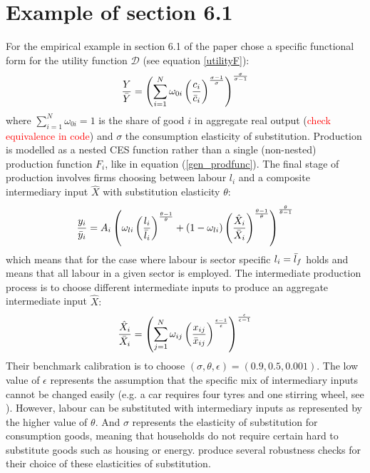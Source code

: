 \documentclass{article}
\begin{document}
\section{Example of section 6.1}
For the empirical example in section 6.1 of the paper \parencite{BF2019} chose a specific functional form for the utility function $\mathcal{D}$ (see equation \ref{utilityF}):
    \begin{equation}
        \frac{Y}{\Bar{Y}} = \left(  \sum_{i=1}^N \omega_{0i} \left( \frac{c_i}{\Bar{c}_i}\right)^{\frac{\sigma-1}{\sigma}} \right)^{\frac{\sigma}{\sigma-1}}
    \end{equation}
where $\sum_{i=1}^N \omega_{0i}=1$ is the share of good $i$ in aggregate real output (\textcolor{red}{check equivalence in code}) and $\sigma$ the consumption elasticity of substitution. \newline
Production is modelled as a nested CES function rather than a single (non-nested) production function $F_i$, like in equation (\ref{gen_prodfunc}). The final stage of production involves firms choosing between labour $l_i$ and a composite intermediary input $\hat{X}$ with substitution elasticity $\theta$:
    \begin{equation}
        \label{eq:cesprodfun}
        \frac{y_i}{\Bar{y}_i} = A_i \left(   \omega_{li} \left( \frac{l_i}{\Bar{l}_i}\right)^{\frac{\theta-1}{\theta}} + (1-\omega_{li}) \left( \frac{\hat{X}_i}{\Bar{X}_i}\right)^{\frac{\theta-1}{\theta}} \right)^{\frac{\theta}{\theta-1}}
    \end{equation}
which means that for the case where labour is sector specific $l_i = \Bar{l}_f$ holds and means that all labour in a given sector is employed. The intermediate production process is to choose different intermediate inputs to produce an aggregate intermediate input $\hat{X}:$
    \begin{equation}
        \frac{\hat{X}_i}{\Bar{X}_i} = \left(  \sum_{j=1}^N \omega_{ij} \left( \frac{x_{ij}}{\Bar{x}_{ij}}\right)^{\frac{\epsilon-1}{\epsilon}} \right)^{\frac{\epsilon}{\epsilon-1}}
    \end{equation}
Their benchmark calibration is to choose $(\sigma, \theta, \epsilon) = (0.9, 0.5, 0.001)$. The low value of $\epsilon$ represents the assumption that the specific mix of intermediary inputs cannot be changed easily (e.g. a car requires four tyres and one stirring wheel, see \parencite[p.129]{burfisherIntroductionComputableGeneral2016}). However, labour can be substituted with intermediary inputs as represented by the higher value of $\theta$. And $\sigma$ represents the elasticity of substitution for consumption goods, meaning that households do not require certain hard to substitute goods such as housing or energy. \cite{BF2019} produce several robustness checks for their choice of these elasticities of substitution. \newline
\end{document}
